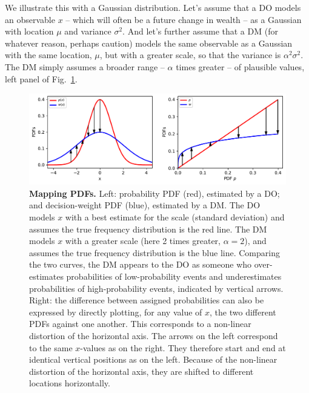\documentclass[a4paper, 12pt]{article}
\newcommand{\flabel}[1]{\label{fig:#1}}
\newcommand{\fref}[1]{Fig.~\ref{fig:#1}}
\begin{document}
We illustrate this with a Gaussian distribution.
Let's assume that a DO models an observable $x$ -- which will often be a future change in wealth -- as a Gaussian with location $\mu$ and variance $\sigma^2$. And let's further assume that a DM (for whatever reason, perhaps caution) models the same observable as a Gaussian with the same location, $\mu$, but with a greater scale, so that the variance is $\alpha^2\sigma^2$. The DM simply assumes a broader range -- $\alpha$ times greater -- of plausible values, left panel of \fref{probability_dists}.

\begin{figure}[htb]
\centering
\includegraphics[width=\textwidth]{./figs/density_map.pdf}
\caption{{\bf Mapping PDFs.} Left: probability PDF (red), estimated by a DO; and decision-weight PDF (blue), estimated by a DM. The DO models $x$ with a best estimate for the scale (standard deviation) and assumes the true frequency distribution is the red line. The DM models $x$ with a greater scale (here 2 times greater, $\alpha=2$), and assumes the true frequency distribution is the blue line. Comparing the two curves, the DM appears to the DO as someone who over-estimates probabilities of low-probability events and underestimates probabilities of high-probability events, indicated by vertical arrows.
Right: the difference between assigned probabilities can also be expressed by directly plotting, for any value of $x$, the two different PDFs against one another. This corresponds to a non-linear distortion of the horizontal axis. The arrows on the left correspond to the same $x$-values as on the right. They therefore start and end at identical vertical positions as on the left. Because of the non-linear distortion of the horizontal axis, they are shifted to different locations horizontally.}
\flabel{probability_dists}
\end{figure}
\end{document}

